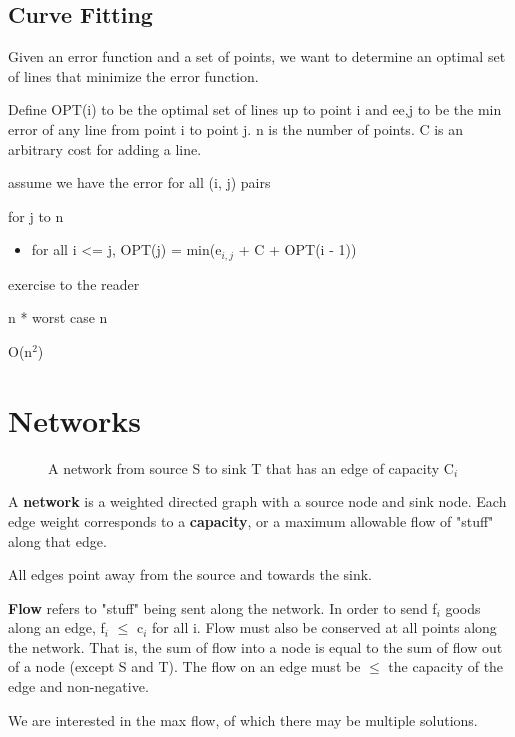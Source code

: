 \section{Curve Fitting}
Given an error function and a set of points, we want to determine an optimal set of lines that minimize the error function.
 
Define OPT(i) to be the optimal set of lines up to point i and ee,j to be the min error of any line from point i to point j. n is the number of points. C is an arbitrary cost for adding a line.

\algorithm
{
    \item assume we have the error for all (i, j) pairs
    \item for j to n
    \begin{itemize}
        \item for all i <= j, OPT(j) = min(e$_{i,j}$ + C + OPT(i - 1))

    \end{itemize}
}
{
    \item exercise to the reader
}
{
    \item n * worst case n
    \item O(n$^2$)
}




\chapter{Networks}
\begin{figure}[ht]
    \centering
    \caption{A network from source S to sink T that has an edge of capacity C$_i$}
\end{figure}

A \textbf{network} is a weighted directed graph with a source node and sink node. Each edge weight corresponds to a \textbf{capacity}, or a maximum allowable flow of "stuff" along that edge.
 
All edges point away from the source and towards the sink.
 
\textbf{Flow} refers to "stuff" being sent along the network. In order to send f$_i$ goods along an edge, f$_i$ $\leq$ c$_i$ for all i. Flow must also be conserved at all points along the network. That is, the sum of flow into a node is equal to the sum of flow out of a node (except S and T). The flow on an edge must be $\leq$ the capacity of the edge and non-negative.
 
We are interested in the max flow, of which there may be multiple solutions.
 

